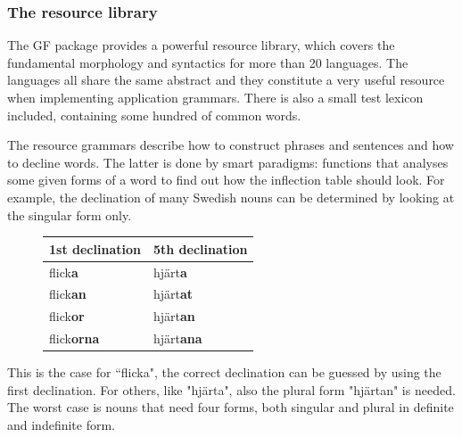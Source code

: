 \documentclass{report}
\begin{document}
\subsubsection{The resource library}
The GF package provides a powerful resource library\cite{gf-resource}, which covers the
fundamental morphology and syntactics for more than 20 languages. %
The languages all share the same abstract and they constitute  
a very useful resource when implementing application grammars.
There is also a small test lexicon included, containing some hundred of common
words.

The resource grammars describe how to construct phrases and sentences and how to
decline words. The latter is done by smart paradigms: functions that analyses
some given forms of a word to find out how the inflection table should look.
For example, the declination of many Swedish nouns can be determined by looking
at the singular form only. 
\begin{figure}
\begin{tabular}{| l | l |}
\hline
1st declination & 5th declination \\
\hline
flick\textbf{a}    &     hjärt\textbf{a}   \\
flick\textbf{an}    &    hjärt\textbf{at}  \\
flick\textbf{or}    &    hjärt\textbf{an}  \\
flick\textbf{orna}  &    hjärt\textbf{ana} \\
\hline
\end{tabular}
\end{figure}
This is the case for ``flicka", the correct declination
can be guessed by using the first declination. %
For others, like "hjärta", also the plural form "hjärtan" is needed.
The worst case is nouns that need four forms, both singular and
plural in definite and indefinite form.
\end{document}
